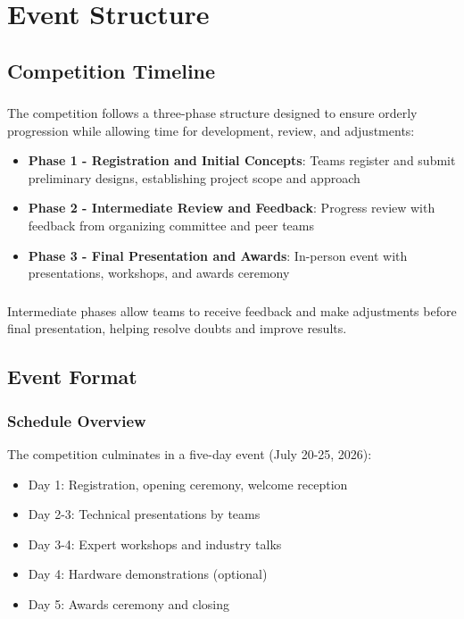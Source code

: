 
\renewcommand{\thesection}{E}
\section{Event Structure}

\subsection{Competition Timeline}

\subsubsection{}
The competition follows a three-phase structure designed to ensure orderly progression while allowing time for development, review, and adjustments:

\begin{itemize}[noitemsep]
    \item \textbf{Phase 1 - Registration and Initial Concepts}: Teams register and submit preliminary designs, establishing project scope and approach
    \item \textbf{Phase 2 - Intermediate Review and Feedback}: Progress review with feedback from organizing committee and peer teams
    \item \textbf{Phase 3 - Final Presentation and Awards}: In-person event with presentations, workshops, and awards ceremony
\end{itemize}

\subsubsection{}
Intermediate phases allow teams to receive feedback and make adjustments before final presentation, helping resolve doubts and improve results.

\subsection{Event Format}

\subsubsection{Schedule Overview}
The competition culminates in a five-day event (July 20-25, 2026):

\begin{itemize}[noitemsep]
    \item Day 1: Registration, opening ceremony, welcome reception
    \item Day 2-3: Technical presentations by teams
    \item Day 3-4: Expert workshops and industry talks
    \item Day 4: Hardware demonstrations (optional)
    \item Day 5: Awards ceremony and closing
\end{itemize}

